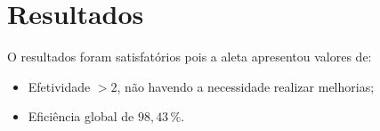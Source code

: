 \section{
  Resultados
 }\label{sec:results}

O resultados foram satisfatórios pois a aleta apresentou valores de:
\begin{itemize}[leftmargin=2cm]
    \item Efetividade \boldmath\(> 2\), não havendo a necessidade realizar melhorias;
    \item Eficiência global de \boldmath\(98,43\,\%\).
\end{itemize}